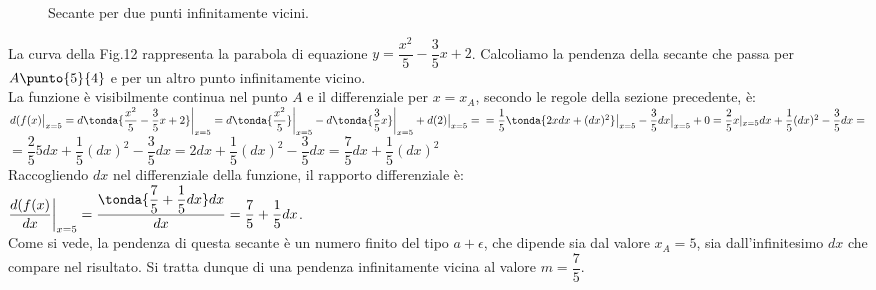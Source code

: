 \begin{figure}[h]
\begin{inaccessibleblock}
 \begin{center}
\secRD
 \end{center}
\end{inaccessibleblock}
\caption{Secante per due punti infinitamente vicini.} 
\label{fig:diff01_tangente}
\end{figure}

\begin{esempio}
  \label{esempio:diff01_mdiff}
  La curva della Fig.12 rappresenta la parabola di equazione 
  $y=\dfrac{x^2}{5}-\dfrac{3}{5}x+2$. Calcoliamo la pendenza della secante che
  passa per $A\punto{5}{4}$ e per un altro punto infinitamente vicino.\\
  La funzione è visibilmente continua nel punto $A$ e il differenziale per 
  $x=x_A$, secondo le regole della sezione precedente, è:\\ 
  $d(f(x)\big|_{x=5}=d\tonda{\dfrac{x^2}{5}-\dfrac{3}{5}x+2}\bigg|_{x=5}=
  d\tonda{\dfrac{x^2}{5}}\bigg|_{x=5}-d\tonda{\dfrac{3}{5}x}\bigg|_{x=5}+
  d(2)\big|_{x=5}=\\
  =\dfrac{1}{5}\tonda{2xdx+(dx)^2}\big|_{x=5}-\dfrac{3}{5}dx\big|_{x=5}+0=
  \dfrac{2}{5}x|_{x=5}dx+\dfrac{1}{5}(dx)^2-\dfrac{3}{5}dx=$\\
  $=\dfrac{2}{5}5dx+\dfrac{1}{5}(dx)^2-\dfrac{3}{5}dx=
  2dx+\dfrac{1}{5}(dx)^2-\dfrac{3}{5}dx=
  \dfrac{7}{5}dx+\dfrac{1}{5}(dx)^2$\\
  Raccogliendo $dx$ nel differenziale della funzione, il rapporto differenziale 
  è:\\
  $\dfrac{d(f(x)}{dx}\bigg|_{x=5}=\dfrac{\tonda{\dfrac{7}{5}+\dfrac{1}{5}dx}dx}
  {dx}=\dfrac{7}{5}+\dfrac{1}{5}dx$.\\
  Come si vede, la pendenza di questa secante è un numero finito del tipo 
  $a+\epsilon$, che dipende sia dal valore $x_A=5$, sia dall'infinitesimo 
  $dx$ che compare nel risultato. Si tratta dunque di una pendenza 
  infinitamente vicina al valore $m=\dfrac{7}{5}$.
\end{esempio}

